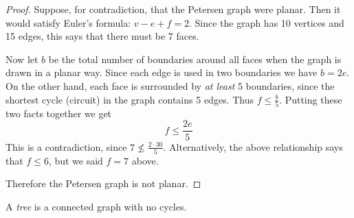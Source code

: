 \documentclass[10pt]{exam}
\begin{document}
\begin{questions}
  \begin{center}
  \end{center}

  \begin{solution}
    \begin{proof}
      Suppose, for contradiction, that the Petersen graph were planar.  Then it would satisfy Euler's formula: $v - e + f = 2$.  Since the graph has 10 vertices and 15 edges, this says that there must be $7$ faces.

      Now let $b$ be the total number of boundaries around all faces when the graph is drawn in a planar way.  Since each edge is used in two boundaries we have $b = 2e$.  On the other hand, each face is surrounded by {\em at least} 5 boundaries, since the shortest cycle (circuit) in the graph contains 5 edges.  Thus $f \le \frac{b}{5}$.  Putting these two facts together we get
      \[f \le \frac{2e}{5}\]
      This is a contradiction, since $7 \not\le \frac{2\cdot 30}{5}$.  Alternatively, the above relationship says that $f \le 6$, but we said $f = 7$ above.

      Therefore the Petersen graph is not planar.
    \end{proof}

  \end{solution}


  \question[9] A {\em tree} is a connected graph with no cycles.
\end{questions}
\end{document}
